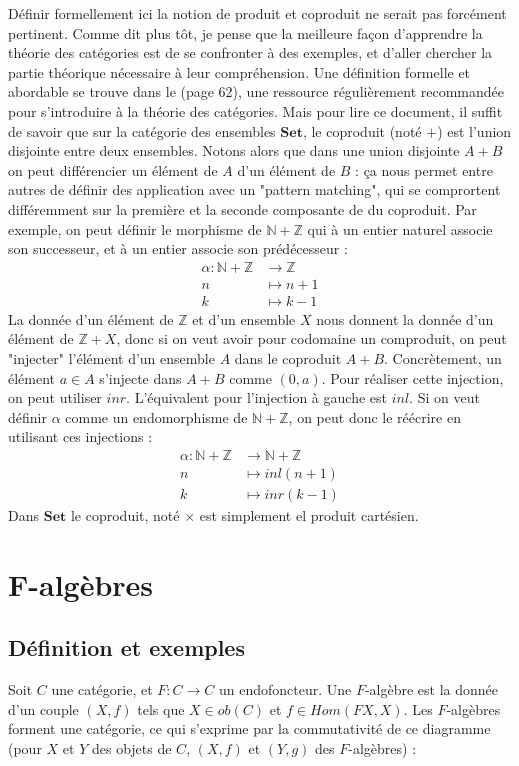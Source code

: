 \documentclass{article}
\newcommand{\N}{\mathbb{N}}
\newcommand{\Z}{\mathbb{Z}}
\begin{document}
Définir formellement ici la notion de produit et coproduit ne serait pas forcément pertinent. Comme dit plus tôt, je pense que la meilleure façon d'apprendre la théorie des catégories est de se confronter à des exemples, et d'aller chercher la partie théorique nécessaire à leur compréhension. Une définition formelle et abordable se trouve dans le \cite{MacLane} (page 62), une ressource régulièrement recommandée pour s'introduire à la théorie des catégories. Mais pour lire ce document, il suffit de savoir que sur la catégorie des ensembles $\mathbf{Set}$, le coproduit (noté $+$) est l'union disjointe entre deux ensembles. Notons alors que dans une union disjointe $A+B$ on peut différencier un élément de $A$ d'un élément de $B$ : ça nous permet entre autres de définir des application avec un "pattern matching", qui se comprortent différemment sur la première et la seconde composante de du coproduit. Par exemple, on peut définir le morphisme de $\N + \Z$ qui à un entier naturel associe son successeur, et à un entier associe son prédécesseur : 
\begin{align*}
     \alpha : \N + \Z & \rightarrow \Z \\ 
     n & \mapsto n+1 \\ 
     k & \mapsto k-1     
\end{align*}
La donnée d'un élément de $\Z$ et d'un ensemble $X$ nous donnent la donnée d'un élément de $\Z + X$, donc si on veut avoir pour codomaine un comproduit, on peut "injecter" l'élément d'un ensemble $A$ dans le coproduit $A+B$. Concrètement,  un élément $a \in A$ s'injecte dans $A+B$ comme $(0,a)$. Pour réaliser cette injection, on peut utiliser $inr$. L'équivalent pour l'injection à gauche est $inl$. Si on veut définir $\alpha$ comme un endomorphisme de $\N + \Z$, on peut donc le réécrire en utilisant ces injections :
\begin{align*}
     \alpha : \N + \Z & \rightarrow \N + \Z \\ 
     n & \mapsto inl(n+1) \\ 
     k & \mapsto inr(k-1)     
\end{align*}
Dans $\mathbf{Set}$ le coproduit, noté $\times$ est simplement el produit cartésien. 


\section{F-algèbres}

\subsection{Définition et exemples}
Soit $C$ une catégorie, et $F :C \longrightarrow C$ un endofoncteur. Une $F$-algèbre est la donnée d'un couple $(X,f)$ tels que $X \in ob(C)$ et $f \in Hom(F X, X)$. Les $F$-algèbres forment une catégorie, ce qui s'exprime par la commutativité de ce diagramme (pour $X$ et $Y$ des objets de $C$, $(X,f)$ et $(Y,g)$ des $F$-algèbres) : 
\end{document}
